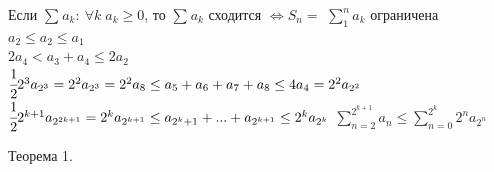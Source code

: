 \documentclass[12pt, paper]{article}
\begin{document}
\begin{tcolorbox}
    Если $ \sum^{}_{} a_k:\ \forall k\; a_k \geq 0$, то $ \sum^{}_{} a_k$ сходится $\Leftrightarrow S_n=$ $ \sum^{n}_{1} a_k$ ограничена\\
    $ a_2 \leq a_2 \leq a_1 $\\
    $2a_4 < a_3 + a_4 \leq 2a_2 $\\
    $\cfrac{1}{2} 2^3 a_{2^3} = 2^2a_{2^3} = 2^2a_8 \leq a_5+a_6+a_7+a_8 \leq 4a_4 = 2^2 a_{2^2}$\\
    $\cfrac{1}{2}2^{k+1} a_{2^{2k+1}} = 2^ka_{2^{k+1}} \leq a_{2^k+1} + ... + a_{2^{k+1}} \leq 2^ka_{2^k}$
    $\sum^{2^{k+1}}_{n=2} a_n \leq \sum^{2^{k}}_{n=0} 2^n a_{2^n}$
\end{tcolorbox}

\begin{theorem}
	Теорема 1.\\
	
\end{theorem}
\end{document}
